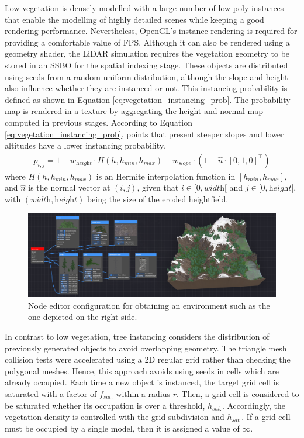 Low-vegetation is densely modelled with a large number of low-poly instances that enable the modelling of highly detailed scenes while keeping a good rendering performance. Nevertheless, OpenGL's instance rendering is required for providing a comfortable value of FPS. Although it can also be rendered using a geometry shader, the LiDAR simulation requires the vegetation geometry to be stored in an SSBO for the spatial indexing stage. These objects are distributed using seeds from a random uniform distribution, although the slope and height also influence whether they are instanced or not. This instancing probability is defined as shown in Equation \ref{eq:vegetation_instancing_prob}. The probability map is rendered in a texture by aggregating the height and normal map computed in previous stages. According to Equation \ref{eq:vegetation_instancing_prob}, points that present steeper slopes and lower altitudes have a lower instancing probability.
\begin{gather}
    \label{eq:vegetation_instancing_prob}
    p_{i, j} = 1 - w_{\textit{height}} \cdot H(h, h_{\textit{min}}, h_{\textit{max}}) - w_{\textit{slope}} \cdot (1 - \hat{n} \cdot \left[0, 1, 0\right]^\intercal)
\end{gather}
where $H(h, h_{\textit{min}}, h_{\textit{max}})$ is an Hermite interpolation function in $[h_{\textit{min}}, h_{\textit{max}}]$, and $\hat{n}$ is the normal vector at $(i, j)$, given that $i \in [0, \textit{width}[$ and $j \in [0, \textit{height}[$, with $\left(\textit{width}, \textit{height}\right)$ being the size of the eroded heightfield.

\begin{figure}
    \centering
    \includegraphics[width=\linewidth]{figs/lidar_simulation/node_editor.png}
	\caption{Node editor configuration for obtaining an environment such as the one depicted on the right side.  }
	\label{fig:node_editor}
\end{figure}

In contrast to low vegetation, tree instancing considers the distribution of previously generated objects to avoid overlapping geometry. The triangle mesh collision tests were accelerated using a 2D regular grid rather than checking the polygonal meshes. Hence, this approach avoids using seeds in cells which are already occupied. Each time a new object is instanced, the target grid cell is saturated with a factor of $f_{\textit{sat.}}$ within a radius $r$. Then, a grid cell is considered to be saturated whether its occupation is over a threshold, $h_{\textit{sat.}}$. Accordingly, the vegetation density is controlled with the grid subdivision and $h_{\textit{sat.}}$. If a grid cell must be occupied by a single model, then it is assigned a value of $\infty$. 

